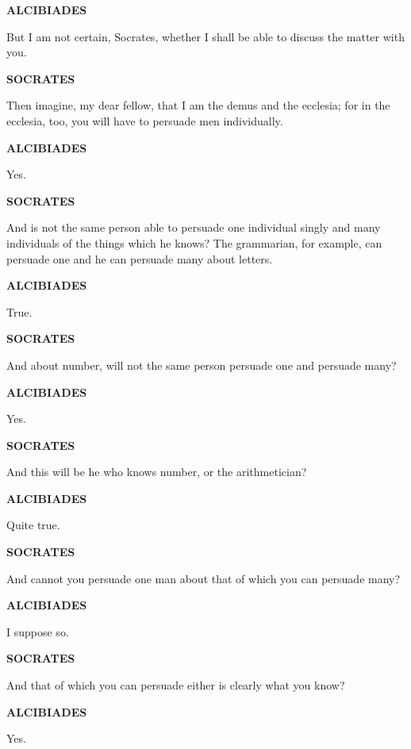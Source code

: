 \documentclass[11pt,letter]{article}
\begin{document}
\par \textbf{ALCIBIADES}
\par   But I am not certain, Socrates, whether I shall be able to discuss the matter with you.

\par \textbf{SOCRATES}
\par   Then imagine, my dear fellow, that I am the demus and the ecclesia; for in the ecclesia, too, you will have to persuade men individually.

\par \textbf{ALCIBIADES}
\par   Yes.

\par \textbf{SOCRATES}
\par   And is not the same person able to persuade one individual singly and many individuals of the things which he knows? The grammarian, for example, can persuade one and he can persuade many about letters.

\par \textbf{ALCIBIADES}
\par   True.

\par \textbf{SOCRATES}
\par   And about number, will not the same person persuade one and persuade many?

\par \textbf{ALCIBIADES}
\par   Yes.

\par \textbf{SOCRATES}
\par   And this will be he who knows number, or the arithmetician?

\par \textbf{ALCIBIADES}
\par   Quite true.

\par \textbf{SOCRATES}
\par   And cannot you persuade one man about that of which you can persuade many?

\par \textbf{ALCIBIADES}
\par   I suppose so.

\par \textbf{SOCRATES}
\par   And that of which you can persuade either is clearly what you know?

\par \textbf{ALCIBIADES}
\par   Yes.
\end{document}

